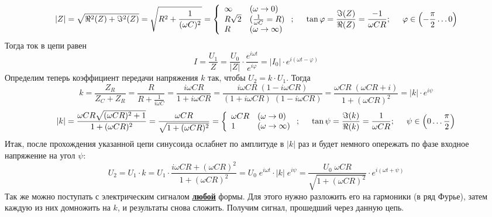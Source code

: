 \begin{displaymath}
|Z|=\sqrt{\Re^2(Z)+\Im^2(Z)}=\sqrt{R^2+\frac1{(\omega C)^2}}=\left\{
\begin{array}{ll}
\infty&(\omega\rightarrow 0)\\
R\sqrt2&(\frac1{\omega C}=R)\\
R&(\omega\rightarrow\infty)
\end{array}\right.
;\hspace{5mm}\tan\varphi=\frac{\Im(Z)}{\Re(Z)}=\frac{-1}{\omega CR};\hspace{5mm}\varphi\in\left(-\frac\pi2\ldots0\right)
\end{displaymath}
Тогда ток в цепи равен\vspace{-3mm}
\begin{displaymath}
I=\frac{U_1}{Z}=\frac{U_0}{|Z|}\cdot \frac{e^{i\omega t}}{e^{i\varphi}}= |I_0|\cdot e^{i(\omega t-\varphi)}
\end{displaymath}
Определим теперь коэффициент передачи напряжения $k$ так, чтобы $U_2=k\cdot U_1$. Тогда
\begin{displaymath}
k=\frac{Z_R}{Z_C+Z_R}=\frac{R}{R+\frac1{i\omega C}}=\frac{i\omega CR}{1+i\omega CR}=
\frac{i\omega CR\;(1-i\omega CR)}{(1+i\omega CR)\;(1-i\omega CR)}=\frac{\omega CR\;(\omega CR+i)}{1+(\omega CR)^2}=|k|\cdot e^{i\psi}
\end{displaymath}
\begin{displaymath}
|k|=\frac{\omega CR\sqrt{(\omega CR)^2+1}}{1+(\omega CR)^2}=\frac{\omega CR}{\sqrt{1+(\omega CR)^2}}=\left\{
\begin{array}{ll}
\omega CR&(\omega\rightarrow 0)\\
1&(\omega\rightarrow\infty)
\end{array}\right.
;\hspace{5mm}\tan\psi=\frac{\Im(k)}{\Re(k)}=\frac{1}{\omega CR};\hspace{5mm}\psi\in\left(0\ldots\frac\pi2\right)
\end{displaymath}
Итак, после прохождения указанной цепи синусоида ослабнет по амплитуде в $|k|$ раз и будет немного опережать по фазе входное напряжение на угол $\psi$:
\begin{displaymath}
U_2=U_1\cdot k= U_1\cdot\frac{i\omega CR+(\omega CR)^2}{1+(\omega CR)^2}=U_0\;e^{i\omega t}\cdot|k|\;e^{i\psi}=\frac{U_0\;\omega CR}{\sqrt{1+(\omega CR)^2}}\cdot
e^{i(\omega t+\psi)}
\end{displaymath}
Так же можно поступать с электрическим сигналом \underline{\bf любой} формы. Для этого нужно разложить его на гармоники (в ряд Фурье), затем каждую из них домножить на $k$, и результаты снова сложить. Получим сигнал, прошедший через данную цепь.

